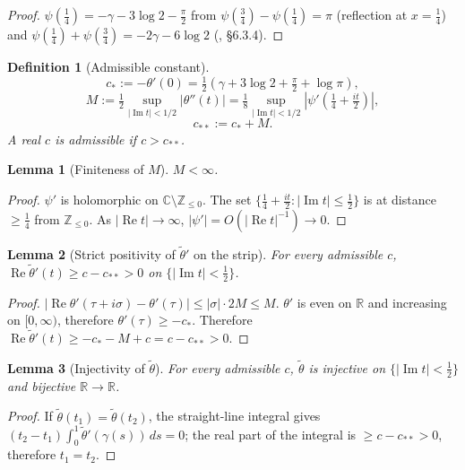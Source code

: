 \documentclass[11pt]{article}
\newtheorem{lemma}{Lemma}
\newtheorem{definition}{Definition}
\DeclareMathOperator{\ImOp}{Im}
\DeclareMathOperator{\ReOp}{Re}
\let\Im\ImOp
\let\Re\ReOp
\begin{document}
\begin{proof}
$\psi(\tfrac{1}{4})=-\gamma-3\log 2-\tfrac{\pi}{2}$ from $\psi(\tfrac{3}{4})-\psi(\tfrac{1}{4})=\pi$ (reflection at $x=\tfrac{1}{4}$) and $\psi(\tfrac{1}{4})+\psi(\tfrac{3}{4})=-2\gamma-6\log 2$ (\cite{AbramowitzStegun}, \S6.3.4).
\end{proof}

\begin{definition}[Admissible constant]\label{def:cstar}
\[
c_*:=-\theta'(0)=\tfrac{1}{2}(\gamma+3\log 2+\tfrac{\pi}{2}+\log\pi),
\]
\[
M:=\tfrac{1}{2}\sup_{|\Im t|<1/2}|\theta''(t)|=\tfrac{1}{8}\sup_{|\Im t|<1/2}|\psi'(\tfrac{1}{4}+\tfrac{it}{2})|,
\]
\[
c_{**}:=c_*+M.
\]
A real $c$ is \emph{admissible} if $c>c_{**}$.
\end{definition}

\begin{lemma}[Finiteness of $M$]\label{lem:Mfinite}
$M<\infty$.
\end{lemma}

\begin{proof}
$\psi'$ is holomorphic on $\mathbb{C}\setminus\mathbb{Z}_{\le 0}$. The set $\{\tfrac{1}{4}+\tfrac{it}{2}:|\Im t|\le\tfrac{1}{2}\}$ is at distance $\ge\tfrac{1}{4}$ from $\mathbb{Z}_{\le 0}$. As $|\Re t|\to\infty$, $|\psi'|=O(|\Re t|^{-1})\to 0$.
\end{proof}

\begin{lemma}[Strict positivity of $\tilde\theta'$ on the strip]\label{lem:tildenonvan}
For every admissible $c$, $\Re\tilde\theta'(t)\ge c-c_{**}>0$ on $\{|\Im t|<\tfrac{1}{2}\}$.
\end{lemma}

\begin{proof}
$|\Re\theta'(\tau+i\sigma)-\theta'(\tau)|\le|\sigma|\cdot 2M\le M$. $\theta'$ is even on $\mathbb{R}$ and increasing on $[0,\infty)$, therefore $\theta'(\tau)\ge-c_*$. Therefore $\Re\tilde\theta'(t)\ge-c_*-M+c=c-c_{**}>0$.
\end{proof}

\begin{lemma}[Injectivity of $\tilde\theta$]\label{lem:stripinj}
For every admissible $c$, $\tilde\theta$ is injective on $\{|\Im t|<\tfrac{1}{2}\}$ and bijective $\mathbb{R}\to\mathbb{R}$.
\end{lemma}

\begin{proof}
If $\tilde\theta(t_1)=\tilde\theta(t_2)$, the straight-line integral gives $(t_2-t_1)\int_0^1\tilde\theta'(\gamma(s))\,ds=0$; the real part of the integral is $\ge c-c_{**}>0$, therefore $t_1=t_2$.
\end{proof}
\end{document}
